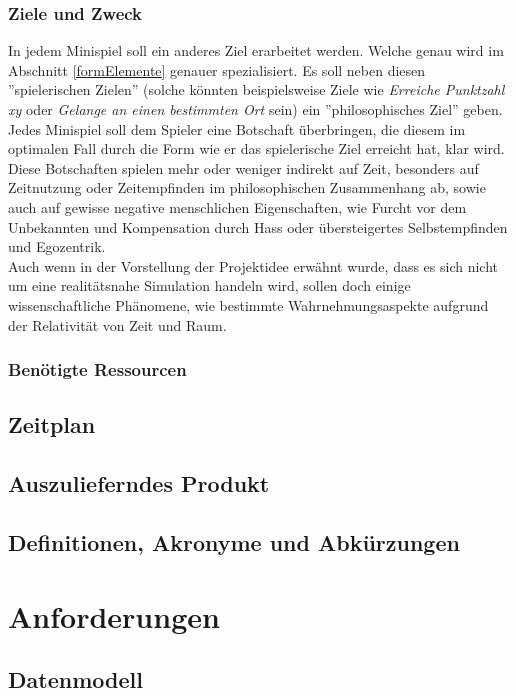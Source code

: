 \documentclass{Ausarbeitung}
\begin{document}
		\subsubsection{Ziele und Zweck}
		\label{ziele}
			In jedem Minispiel soll ein anderes Ziel erarbeitet werden. Welche genau wird im Abschnitt \ref{formElemente} genauer spezialisiert. Es soll neben diesen ''spielerischen Zielen'' (solche könnten beispielsweise Ziele wie \textit{Erreiche Punktzahl xy} oder \textit{Gelange an einen bestimmten Ort} sein) ein ''philosophisches Ziel'' geben. Jedes Minispiel soll dem Spieler eine Botschaft überbringen, die diesem im optimalen Fall durch die Form wie er das spielerische Ziel erreicht hat, klar wird. Diese Botschaften spielen mehr oder weniger indirekt auf Zeit, besonders auf Zeitnutzung oder Zeitempfinden im philosophischen Zusammenhang ab, sowie auch auf gewisse negative menschlichen Eigenschaften, wie Furcht vor dem Unbekannten und Kompensation durch Hass oder übersteigertes Selbstempfinden und Egozentrik. \\ 
			Auch wenn in der Vorstellung der Projektidee erwähnt wurde, dass es sich nicht um eine realitätsnahe Simulation handeln wird, sollen doch einige wissenschaftliche Phänomene, wie bestimmte Wahrnehmungsaspekte aufgrund der Relativität von Zeit und Raum. 
		\subsubsection{Benötigte Ressourcen}
		\label{ressourcen}
	\subsection{Zeitplan}
	\label{plan}
	\subsection{Auszulieferndes Produkt}
	\label{produkt}
	\subsection{Definitionen, Akronyme und Abkürzungen}
	\label{glossar}
\clearpage
\section{Anforderungen}
\label{anforderungen}
	\subsection{Datenmodell}
	\label{datenmodell}
\end{document}
